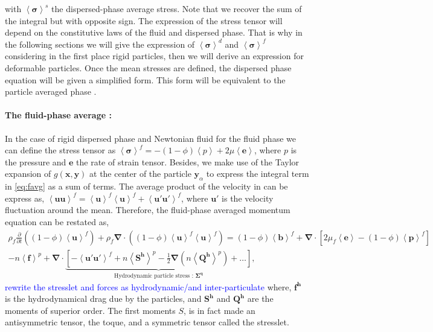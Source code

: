 with $\left<\bm{\sigma}\right>^s$ the dispersed-phase average stress. 
Note that we recover the sum of the integral but with opposite sign.
The expression of the stress tensor will depend on the constitutive laws of the fluid and dispersed phase.  
That is why in the following sections we will give the expression of $\left<\bm{\sigma}\right>^d$ and $\left<\bm{\sigma}\right>^f$ considering in the first place rigid particles, then we will derive an expression for deformable particles. 
Once the mean stresses are defined, the dispersed phase equation will be given a simplified form.
This form will be equivalent to the particle averaged phase \citet{nott2011suspension}. 

\paragraph*{The fluid-phase average :} In the case of rigid dispersed phase and Newtonian fluid for the fluid phase we can define the stress tensor as $\left<\bm{\sigma}\right>^f = -(1-\phi)\left<p\right> + 2\mu\left<\bm{e}\right>$, where $p$ is the pressure and $\bm{e}$ the rate of strain tensor. 
Besides, we make use of the Taylor expansion of $g(\bm{x},\bm{y})$ at the center of the particle $\bm{y}_\alpha$ to express the integral term in \ref{eq:favg} as a sum of terms.  
The average product of the velocity in can be express as, $\left<\bm{uu}\right>^f = \left<\bm{u}\right>^f\left<\bm{u}\right>^f + \left<\bm{u'u'}\right>^f$, where $\bm{u'}$ is the velocity fluctuation around the mean. 
Therefore, the fluid-phase averaged momentum equation can be restated as, 
\begin{multline}
    \rho_f\frac{\partial}{\partial t} ((1-\phi)\left<\bm{u}\right>^f) + \rho_f\bm{\nabla}\cdot\left((1-\phi) \left<\bm{u}\right>^f\left<\bm{u}\right>^f\right)= (1-\phi)\left<\bm{b}\right>^f +\bm{\nabla}\cdot\left[2 \mu_f\left<\bm{e}\right> -(1-\phi) \left<\bm{p}\right>^f\right]\\-n\left<\bm{f}\right>^p+\bm{\nabla}\cdot\underbrace{\left[ - \left<\bm{u'u'}\right>^f +n\left<\bm{S^h}\right>^p -\frac{1}{2}\bm{\nabla}(n\left<\bm{Q^h}\right>^p) + \ldots\right]}_{\text{Hydrodynamic particle stress : } \bm{\Sigma^q}},
    \label{eq:favgsp}
\end{multline}
\textcolor{blue}{rewrite the stresslet and forces as hydrodynamic/and inter-particulate}
where, $\bm{f^h}$ is the hydrodynamical drag due by the particles, and $\bm{S^h}$ and $\bm{Q^h}$ are the moments of superior order.
The first moments $S$, is in fact made an antisymmetric tensor, the toque, and a symmetric tensor called the stresslet.
